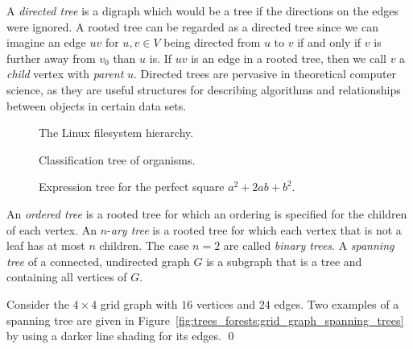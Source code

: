 A \emph{directed tree} is a digraph which would
be a tree if the directions on the edges were ignored. A rooted tree
can be regarded as a directed tree since we can imagine an edge $uv$
for $u,v \in V$ being directed from $u$ to $v$ if and only if $v$ is
further away from $v_0$ than $u$ is. If $uv$ is an edge in a rooted
tree, then we call $v$ a \emph{child} vertex with
\emph{parent} $u$. Directed trees are pervasive in
theoretical computer science, as they are useful structures for
describing algorithms and relationships between objects in certain
data sets.

\begin{figure}[!htbp]
\centering
{}

\caption{The Linux filesystem hierarchy.}
\label{fig:trees_forests:filesystem_hierarchy}
\end{figure}

\begin{figure}[!htbp]
\centering
{}

\caption{Classification tree of organisms.}
\label{fig:trees_forests:classification_tree_organisms}
\end{figure}

\begin{figure}[!htbp]
\centering
{}

\caption{Expression tree for the perfect square $a^2 + 2ab + b^2$.}
\label{fig:trees_forests:expression_tree_perfect_square}
\end{figure}

An \emph{ordered tree} is a rooted tree for which
an ordering is specified for the children of each vertex. An
$n$-\emph{ary tree} is a rooted tree for which
each vertex that is not a leaf has at most $n$ children. The case
$n = 2$ are called \emph{binary trees}. A
\emph{spanning tree} of a connected, undirected
graph $G$ is a subgraph that is a tree and containing all vertices of
$G$.

\begin{example}
\label{eg:trees_forests:spanning_tree}
{\rm
Consider the $4 \times 4$ grid graph with $16$ vertices and
$24$ edges. Two examples of a spanning tree are given in
Figure~\ref{fig:trees_forests:grid_graph_spanning_trees} by using a
darker line shading for its edges.}
\qed
\end{example}

